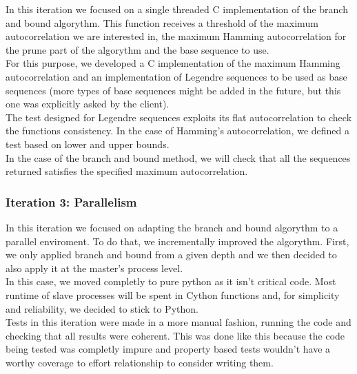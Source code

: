       In this iteration we focused on a single threaded C implementation of the
      branch and bound algorythm. This function receives a threshold of the
      maximum autocorrelation we are interested in, the maximum Hamming
      autocorrelation for the prune part of the algorythm and the base sequence
      to use.\\

      For this purpose, we developed a C implementation of the maximum Hamming
      autocorrelation and an implementation of Legendre sequences to be used
      as base sequences (more types of base sequences might be added in the
      future, but this one was explicitly asked by the client).\\

      The test designed for Legendre sequences exploits its flat
      autocorrelation to check the functions consistency. In the case of
      Hamming's autocorrelation, we defined a test based on lower and upper
      bounds.\\

      In the case of the branch and bound method, we will check that all the
      sequences returned satisfies the specified maximum autocorrelation.\\

      \subsubsection{Iteration 3: Parallelism}

      In this iteration we focused on adapting the branch and bound algorythm
      to a parallel enviroment. To do that, we incrementally improved the
      algorythm. First, we only applied branch and bound from a given depth and
      we then decided to also apply it at the master's process level.\\

      In this case, we moved completly to pure python as it isn't critical
      code. Most runtime of slave processes will be spent in Cython functions
      and, for simplicity and reliability, we decided to stick to Python.\\

      Tests in this iteration were made in a more manual fashion, running the
      code and checking that all results were coherent. This was done like
      this because the code being tested was completly impure and property
      based tests wouldn't have a worthy coverage to effort relationship to
      consider writing them.\\

